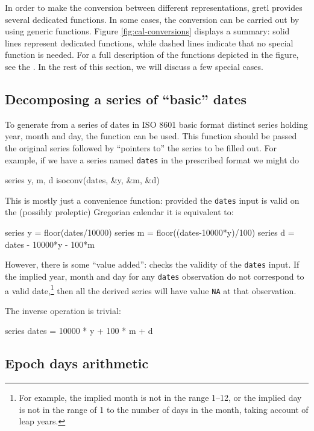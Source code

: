 In order to make the conversion between different representations,
gretl provides several dedicated functions. In some cases, the
conversion can be carried out by using generic functions. Figure
\ref{fig:cal-conversions} displays a summary: solid lines represent
dedicated functions, while dashed lines indicate that no special
function is needed. For a full description of the functions depicted
in the figure, see the \GCR. In the rest of this section, we will
discuss a few special cases.

\subsection{Decomposing a series of ``basic'' dates}

To generate from a series of dates in ISO 8601 basic format distinct
series holding year, month and day, the function  can be
used. This function should be passed the original series followed by
``pointers to'' the series to be filled out. For example, if we have a
series named \texttt{dates} in the prescribed format we might do
%
\begin{code}
series y, m, d
isoconv(dates, &y, &m, &d)
\end{code}

This is mostly just a convenience function: provided the
\texttt{dates} input is valid on the (possibly proleptic) Gregorian
calendar it is equivalent to:
%
\begin{code}
series y = floor(dates/10000)
series m = floor((dates-10000*y)/100)
series d = dates - 10000*y - 100*m
\end{code}

However, there is some ``value added'':  checks the
validity of the \texttt{dates} input. If the implied year, month and
day for any \texttt{dates} observation do not correspond to a valid
date,\footnote{For example, the implied month is not in the range
  1--12, or the implied day is not in the range of 1 to the number of
  days in the month, taking account of leap years.} then all the
derived series will have value \texttt{NA} at that observation.

The inverse operation is trivial:
\begin{code}
series dates = 10000 * y + 100 * m + d
\end{code}

\subsection{Epoch days arithmetic}

